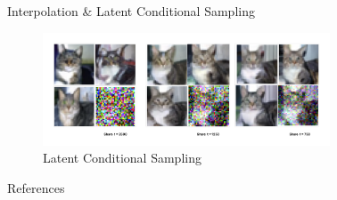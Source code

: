 \documentclass[final]{beamer}
\newlength{\sepwidth}
\newlength{\colwidth}
\newcommand{\separatorcolumn}{\begin{column}{\sepwidth}\end{column}}
\begin{document}
\begin{frame}[t]
\begin{columns}[t]
\begin{column}{\colwidth}
\begin{block}{Interpolation \& Latent Conditional Sampling}
				\begin{figure}[h]
					\centering
					\includegraphics[width=0.8\textwidth]{figs/latent_conditional.png}
					\caption{Latent Conditional Sampling}
					\label{fig:latent_conditional}
				\end{figure}
				
			\end{block}

			\begin{block}{References}

				\nocite{*}
				\footnotesize{}

			\end{block}

		\end{column}

		\separatorcolumn
	\end{columns}
\end{frame}
\end{document}
